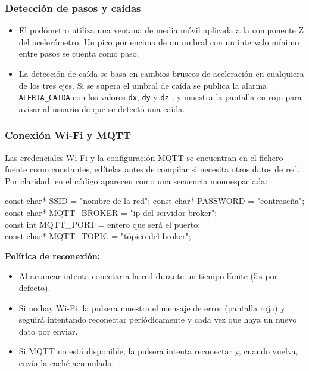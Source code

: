 \documentclass[12pt, a4paper]{article}
\begin{document}
\begin{umaappendices}
	\subsubsection{Detección de pasos y caídas}
	\begin{itemize}
		\item El podómetro utiliza una ventana de media móvil aplicada a la componente Z del acelerómetro. Un pico por encima de un umbral con un intervalo mínimo entre pasos se cuenta como paso.
		\item La detección de caída se basa en cambios bruscos de aceleración en cualquiera de los tres ejes. Si se supera el umbral de caída se publica la alarma \texttt{ALERTA\_CAIDA} con los valores \texttt{dx}, \texttt{dy} y \texttt{dz} , y muestra la pantalla en rojo para avisar al usuario de que se detectó una caída.
	\end{itemize}
	
	\subsubsection{Conexión Wi-Fi y MQTT}
	Las credenciales Wi-Fi y la configuración MQTT se encuentran en el fichero fuente como constantes; edítelas antes de compilar si necesita otros datos de red. Por claridad, en el código aparecen como una secuencia monoespaciada:
	
	\bigskip
	{\ttfamily\small
		const char* SSID     = "nombre de la red";
		const char* PASSWORD = "contraseña";\\
		const char* MQTT\_BROKER = "ip del servidor broker";\\
		const int   MQTT\_PORT   = entero que será el puerto;\\
		const char* MQTT\_TOPIC  = "tópico del broker";\\
	}
	\bigskip
	
	\noindent\textbf{Política de reconexión:}
	\begin{itemize}
		\item Al arrancar intenta conectar a la red durante un tiempo límite (5\,s por defecto).
		\item Si no hay Wi-Fi, la pulsera muestra el mensaje de error (pantalla roja) y seguirá intentando reconectar periódicamente y cada vez que haya un nuevo dato por enviar.
		\item Si MQTT no está disponible, la pulsera intenta reconectar y, cuando vuelva, envía la caché acumulada.
	\end{itemize}
	

\end{umaappendices}
\end{document}
